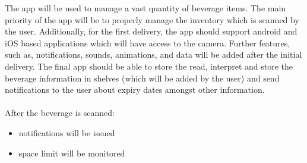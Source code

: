The app will be used to manage a vast quantity of beverage items. The main priority of the app will be to 
properly manage the inventory which is scanned by the user. Additionally, for the first delivery, 
the app should support android and iOS based applications which will have access to the camera. 
Further features, such as, notifications, sounds, animations, and data will be added after the initial delivery.
The final app should be able to store the read, interpret and store the beverage information in shelves (which will be added by the user) 
and send notifications to the user about expiry dates amongst other information.
\\
\\
After the beverage is scanned:
\begin{itemize}
  \item notifications will be issued
  \item space limit will be monitored
\end{itemize}
